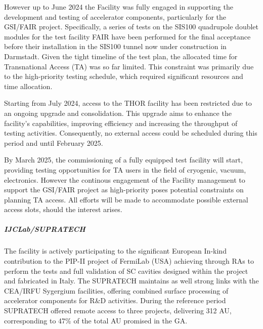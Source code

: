However up to June 2024 the Facility was fully engaged in supporting the development and testing of accelerator components, particularly for the GSI/FAIR project. Specifically, a series of tests on the SIS100 quadrupole doublet modules for the test facility FAIR have been performed for the final acceptance before their installation in the SIS100 tunnel now under construction in Darmstadt. Given the tight timeline of the test plan, the allocated time for Transnational Access (TA) was so far limited. This constraint was primarily due to the high-priority testing schedule, which required significant resources and time allocation.

Starting from July 2024, access to the THOR facility has been restricted due to an ongoing upgrade and consolidation. This upgrade aims to enhance the facility’s capabilities, improving efficiency and increasing the throughput of testing activities. Consequently, no external access could be scheduled during this period and until February 2025.

By March 2025, the commissioning of a fully equipped test facility will start, providing testing opportunities for TA users in the field of cryogenic, vacuum, electronics. However the continous engagement of the Facility management to support the GSI/FAIR project as high-priority poses potential constraints on planning TA access. All efforts will be made to accommodate possible external access slots, should the interest arises. 

\subparagraph{IJCLab/SUPRATECH}
The facility is actively participating to the significant European In-kind contribution  to the PIP-II project of FermiLab (USA) achieving through RAs to perform the tests and full validation of SC cavities designed within the project and fabricated in Italy. The SUPRATECH maintains as well strong links with the CEA/IRFU Sygergium facilities, offering combined surface processing of accelerator components for R\&D activities. 
During the reference period SUPRATECH offered remote access to three projects, delivering 312 AU, corresponding to 47\% of the total AU promised in the GA. 




